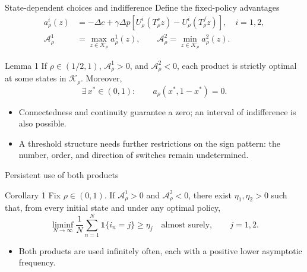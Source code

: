 \documentclass[10pt]{beamer}
\begin{document}
\begin{frame}{State-dependent choices and indifference}
    Define the fixed-policy advantages
    \[
    \begin{aligned}
        a_\rho^i(z)&=-\Delta c+\gamma\Delta p
        [U_\rho^i(T_\rho^s z)-U_\rho^i(T_\rho^f z)],\quad i=1,2,\\
        \mathcal A_\rho^1&=\max_{z\in\mathcal K_\rho}a_\rho^1(z),
        \qquad
        \mathcal A_\rho^2=\min_{z\in\mathcal K_\rho}a_\rho^2(z).
    \end{aligned}
    \]

    \begin{block}{Lemma 1}
        If $\rho\in(1/2,1)$, $\mathcal A_\rho^1>0$, and
        $\mathcal A_\rho^2<0$, each product is strictly optimal at some
        states in $\mathcal K_\rho$. Moreover,
        \[
        \exists\,x^*\in(0,1):\qquad a_\rho(x^*,1-x^*)=0.
        \]
    \end{block}

    \begin{itemize}
        \item Connectedness and continuity guarantee a zero; an interval
        of indifference is also possible.
        \item A threshold structure needs further restrictions on the sign
        pattern: the number, order, and direction of switches remain
        undetermined.
    \end{itemize}
\end{frame}

\begin{frame}{Persistent use of both products}
    \begin{block}{Corollary 1}
        Fix $\rho\in(0,1)$. If $\mathcal A_\rho^1>0$ and
        $\mathcal A_\rho^2<0$, there exist $\eta_1,\eta_2>0$ such that,
        from every initial state and under any optimal policy,
        \[
        \liminf_{N\to\infty}\frac{1}{N}
        \sum_{n=1}^{N}\mathbf 1\{i_n=j\}
        \ge\eta_j
        \quad\text{almost surely},\qquad j=1,2.
        \]
    \end{block}

    \begin{itemize}
        \item Both products are used infinitely often, each with a positive
        lower asymptotic frequency.
    \end{itemize}
\end{frame}
\end{document}
